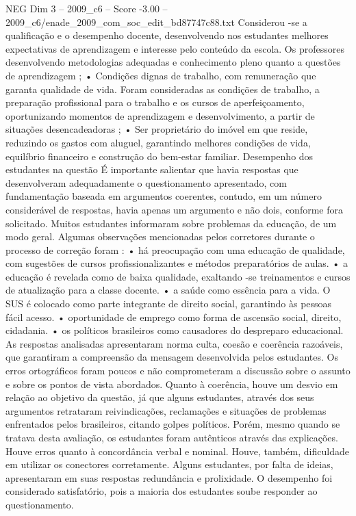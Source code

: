 \begin{textsample}{NEG Dim 3 – 2009\_c6 – Score -3.00 – 2009\_c6/enade\_2009\_com\_soc\_edit\_bd87747c88.txt}
Considerou -se a qualificação e o desempenho docente, desenvolvendo nos estudantes melhores expectativas de aprendizagem e interesse pelo conteúdo da escola.
Os professores desenvolvendo metodologias adequadas e conhecimento pleno quanto a questões de aprendizagem ; • Condições dignas de trabalho, com remuneração que garanta qualidade de vida.
Foram consideradas as condições de trabalho, a preparação profissional para o trabalho e os cursos de aperfeiçoamento, oportunizando momentos de aprendizagem e desenvolvimento, a partir de situações desencadeadoras ; • Ser proprietário do imóvel em que reside, reduzindo os gastos com aluguel, garantindo melhores condições de vida, equilíbrio financeiro e construção do bem-estar familiar.
Desempenho dos estudantes na questão É importante salientar que havia respostas que desenvolveram adequadamente o questionamento apresentado, com fundamentação baseada em argumentos coerentes, contudo, em um número considerável de respostas, havia apenas um argumento e não dois, conforme fora solicitado.
Muitos estudantes informaram sobre problemas da educação, de um modo geral.
Algumas observações mencionadas pelos corretores durante o processo de correção foram : • há preocupação com uma educação de qualidade, com sugestões de cursos profissionalizantes e métodos preparatórios de aulas. • a educação é revelada como de baixa qualidade, exaltando -se treinamentos e cursos de atualização para a classe docente. • a saúde como essência para a vida.
O SUS é colocado como parte integrante de direito social, garantindo às pessoas fácil acesso. • oportunidade de emprego como forma de ascensão social, direito, cidadania. • os políticos brasileiros como causadores do despreparo educacional.
As respostas analisadas apresentaram norma culta, coesão e coerência razoáveis, que garantiram a compreensão da mensagem desenvolvida pelos estudantes.
Os erros ortográficos foram poucos e não comprometeram a discussão sobre o assunto e sobre os pontos de vista abordados.
Quanto à coerência, houve um desvio em relação ao objetivo da questão, já que alguns estudantes, através dos seus argumentos retrataram reivindicações, reclamações e situações de problemas enfrentados pelos brasileiros, citando golpes políticos.
Porém, mesmo quando se tratava desta avaliação, os estudantes foram autênticos através das explicações.
Houve erros quanto à concordância verbal e nominal.
Houve, também, dificuldade em utilizar os conectores corretamente.
Alguns estudantes, por falta de ideias, apresentaram em suas respostas redundância e prolixidade.
O desempenho foi considerado satisfatório, pois a maioria dos estudantes soube responder ao questionamento.

\end{textsample}
